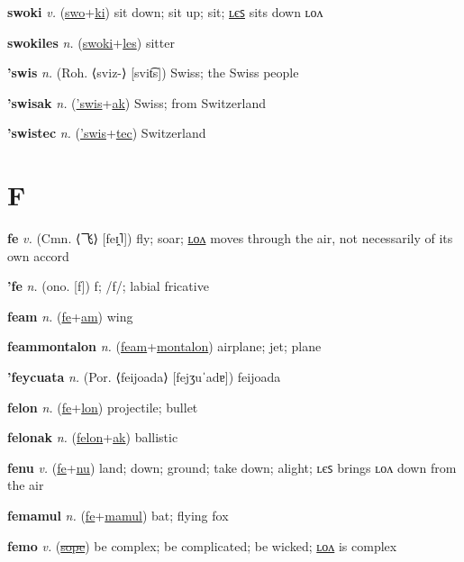 \textbf{\hypertarget{swoki}{swoki}} \textit{v.} (\hyperlink{swo}{swo}+\allowbreak \hyperlink{ki}{ki})
sit down; sit up; sit; \hyperlink{swokiles}{ʟєꜱ} sits down ʟᴏᴧ

\textbf{\hypertarget{swokiles}{swokiles}} \textit{n.} (\hyperlink{swoki}{swoki}+\allowbreak \hyperlink{les}{les})
sitter

\textbf{\hypertarget{'swis}{'swis}} \textit{n.} (Roh. ⟨sviz-⟩ [svit͡s])
Swiss; the Swiss people

\textbf{\hypertarget{'swisak}{'swisak}} \textit{n.} (\hyperlink{'swis}{'swis}+\allowbreak \hyperlink{ak}{ak})
Swiss; from Switzerland

\textbf{\hypertarget{'swistec}{'swistec}} \textit{n.} (\hyperlink{'swis}{'swis}+\allowbreak \hyperlink{tec}{tec})
Switzerland

\section{F}

\textbf{\hypertarget{fe}{fe}} \textit{v.} (Cmn. ⟨{\chinese{}飞}⟩ [feɪ̯˥])
fly; soar; \hyperlink{felon}{ʟᴏᴧ} moves through the air, not necessarily of its own accord

\textbf{\hypertarget{'fe}{'fe}} \textit{n.} (ono. [f])
f; /f/; labial fricative

\textbf{\hypertarget{feam}{feam}} \textit{n.} (\hyperlink{fe}{fe}+\allowbreak \hyperlink{am}{am})
wing

\textbf{\hypertarget{feammontalon}{feammontalon}} \textit{n.} (\hyperlink{feam}{feam}+\allowbreak \hyperlink{montalon}{montalon})
airplane; jet; plane

\textbf{\hypertarget{'feycuata}{'feycuata}} \textit{n.} (Por. ⟨feijoada⟩ [fejʒuˈadɐ])
feijoada

\textbf{\hypertarget{felon}{felon}} \textit{n.} (\hyperlink{fe}{fe}+\allowbreak \hyperlink{lon}{lon})
projectile; bullet

\textbf{\hypertarget{felonak}{felonak}} \textit{n.} (\hyperlink{felon}{felon}+\allowbreak \hyperlink{ak}{ak})
ballistic

\textbf{\hypertarget{fenu}{fenu}} \textit{v.} (\hyperlink{fe}{fe}+\allowbreak \hyperlink{nu}{nu})
land; down; ground; take down; alight; ʟєꜱ brings ʟᴏᴧ down from the air

\textbf{\hypertarget{femamul}{femamul}} \textit{n.} (\hyperlink{fe}{fe}+\allowbreak \hyperlink{mamul}{mamul})
bat; flying fox

\textbf{\hypertarget{femo}{femo}} \textit{v.} (\hyperlink{sope}{\sout{sope}})
be complex; be complicated; be wicked; \hyperlink{femolon}{ʟᴏᴧ} is complex

